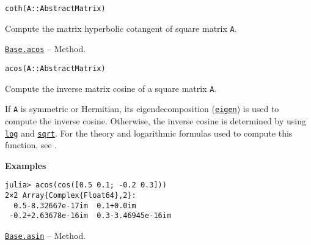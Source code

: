 \begin{adjustwidth}{2em}{0pt}


\begin{verbatim}
coth(A::AbstractMatrix)
\end{verbatim}

Compute the matrix hyperbolic cotangent of square matrix \texttt{A}.



\end{adjustwidth}
\hypertarget{13124751178617899053}{} 
\hyperlink{13124751178617899053}{\texttt{Base.acos}}  -- {Method.}

\begin{adjustwidth}{2em}{0pt}


\begin{verbatim}
acos(A::AbstractMatrix)
\end{verbatim}

Compute the inverse matrix cosine of a square matrix \texttt{A}.

If \texttt{A} is symmetric or Hermitian, its eigendecomposition (\hyperlink{11056016707394839114}{\texttt{eigen}}) is used to compute the inverse cosine. Otherwise, the inverse cosine is determined by using \hyperlink{17317607370922767936}{\texttt{log}} and \hyperlink{4551113327515323898}{\texttt{sqrt}}.  For the theory and logarithmic formulas used to compute this function, see \footnotemark[12].

\textbf{Examples}


\begin{verbatim}
julia> acos(cos([0.5 0.1; -0.2 0.3]))
2×2 Array{Complex{Float64},2}:
  0.5-8.32667e-17im  0.1+0.0im
 -0.2+2.63678e-16im  0.3-3.46945e-16im
\end{verbatim}



\end{adjustwidth}
\hypertarget{13323825159284566975}{} 
\hyperlink{13323825159284566975}{\texttt{Base.asin}}  -- {Method.}


